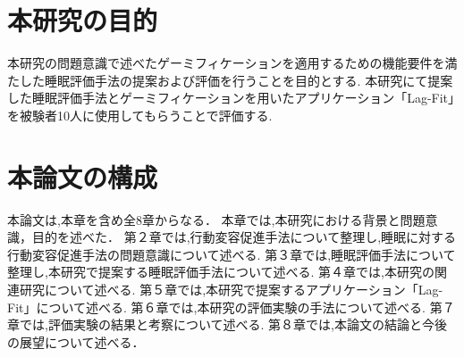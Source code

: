 \section{本研究の目的}
本研究の問題意識で述べたゲーミフィケーションを適用するための機能要件を満たした睡眠評価手法の提案および評価を行うことを目的とする.
本研究にて提案した睡眠評価手法とゲーミフィケーションを用いたアプリケーション「Lag-Fit」を被験者10人に使用してもらうことで評価する.

\section{本論文の構成}
本論文は,本章を含め全8章からなる．
本章では,本研究における背景と問題意識，目的を述べた．
第２章では,行動変容促進手法について整理し,睡眠に対する行動変容促進手法の問題意識について述べる.
第３章では,睡眠評価手法について整理し,本研究で提案する睡眠評価手法について述べる.
第４章では,本研究の関連研究について述べる.
第５章では,本研究で提案するアプリケーション「Lag-Fit」について述べる.
第６章では,本研究の評価実験の手法について述べる.
第７章では,評価実験の結果と考察について述べる.
第８章では,本論文の結論と今後の展望について述べる．
